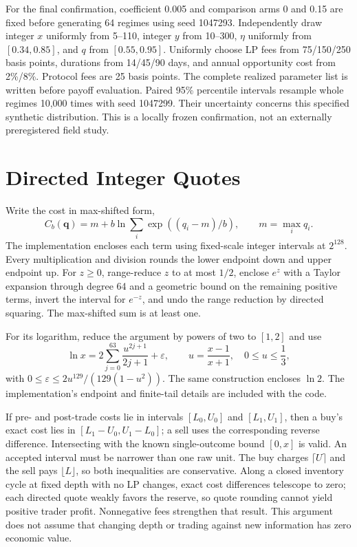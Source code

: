 \documentclass[10pt]{article}
\begin{document}
For the final confirmation, coefficient 0.005 and comparison arms 0 and 0.15 are fixed before generating 64 regimes using seed 1047293. Independently draw integer $x$ uniformly from 5--110, integer $y$ from 10--300, $\eta$ uniformly from $[0.34,0.85]$, and $q$ from $[0.55,0.95]$. Uniformly choose LP fees from 75/150/250 basis points, durations from 14/45/90 days, and annual opportunity cost from 2\%/8\%. Protocol fees are 25 basis points. The complete realized parameter list is written before payoff evaluation. Paired 95\% percentile intervals resample whole regimes 10,000 times with seed 1047299. Their uncertainty concerns this specified synthetic distribution. This is a locally frozen confirmation, not an externally preregistered field study.

\section{Directed Integer Quotes}

Write the cost in max-shifted form,
\[
C_b(\mathbf q)=m+b\ln\!\sum_i\exp((q_i-m)/b),\qquad m=\max_iq_i.
\]
The implementation encloses each term using fixed-scale integer intervals at $2^{128}$. Every multiplication and division rounds the lower endpoint down and upper endpoint up. For $z\ge0$, range-reduce $z$ to at most $1/2$, enclose $e^z$ with a Taylor expansion through degree 64 and a geometric bound on the remaining positive terms, invert the interval for $e^{-z}$, and undo the range reduction by directed squaring. The max-shifted sum is at least one.

For its logarithm, reduce the argument by powers of two to $[1,2]$ and use
\[
\ln x=2\sum_{j=0}^{63}\frac{u^{2j+1}}{2j+1}+\varepsilon,
\qquad u=\frac{x-1}{x+1},\quad 0\le u\le\frac13,
\]
with $0\le\varepsilon\le2u^{129}/(129(1-u^2))$. The same construction encloses $\ln2$. The implementation's endpoint and finite-tail details are included with the code.

If pre- and post-trade costs lie in intervals $[L_0,U_0]$ and $[L_1,U_1]$, then a buy's exact cost lies in $[L_1-U_0,U_1-L_0]$; a sell uses the corresponding reverse difference. Intersecting with the known single-outcome bound $[0,x]$ is valid. An accepted interval must be narrower than one raw unit. The buy charges $\lceil U\rceil$ and the sell pays $\lfloor L\rfloor$, so both inequalities are conservative. Along a closed inventory cycle at fixed depth with no LP changes, exact cost differences telescope to zero; each directed quote weakly favors the reserve, so quote rounding cannot yield positive trader profit. Nonnegative fees strengthen that result. This argument does not assume that changing depth or trading against new information has zero economic value.
\end{document}
